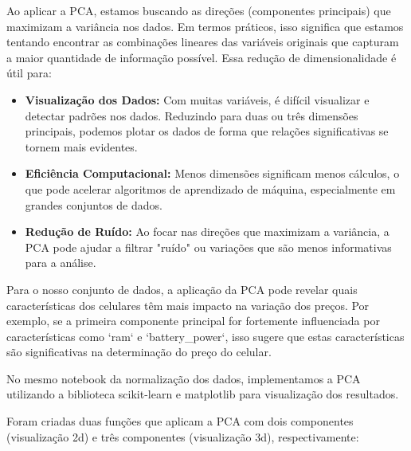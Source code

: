 \documentclass[conference]{IEEEtran}
\begin{document}
Ao aplicar a PCA, estamos buscando as direções (componentes principais) que maximizam 
a variância nos dados. Em termos práticos, isso significa que estamos tentando 
encontrar as combinações lineares das variáveis originais que capturam a maior 
quantidade de informação possível. Essa redução de dimensionalidade é útil para:

\begin{itemize}
    \item \textbf{Visualização dos Dados:} 
    Com muitas variáveis, é difícil visualizar e detectar padrões nos dados. 
    Reduzindo para duas ou três dimensões principais, 
    podemos plotar os dados de forma que 
    relações significativas se tornem mais evidentes.

    \item \textbf{Eficiência Computacional:} 
    Menos dimensões significam menos cálculos, o que pode acelerar 
    algoritmos de aprendizado de máquina, especialmente em grandes conjuntos de dados.

    \item \textbf{Redução de Ruído:} Ao focar nas direções que maximizam a variância, 
    a PCA pode ajudar a filtrar "ruído" ou variações que são menos informativas 
    para a análise.
\end{itemize}

Para o nosso conjunto de dados, a aplicação da PCA pode revelar 
quais características dos celulares têm mais impacto na variação dos preços. 
Por exemplo, se a primeira componente principal for fortemente influenciada 
por características como `ram` e `battery\_power`, 
isso sugere que estas características são significativas na determinação 
do preço do celular.

No mesmo notebook da normalização dos dados, 
implementamos a PCA utilizando a biblioteca scikit-learn e 
matplotlib para visualização dos resultados.

Foram criadas duas funções que aplicam a PCA com dois componentes (visualização 2d) 
e três componentes (visualização 3d), respectivamente:
\end{document}
